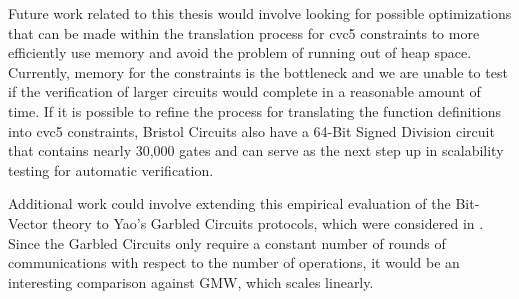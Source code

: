 \documentclass{article}
\begin{document}
Future work related to this thesis would involve looking for possible optimizations that can be made within the translation process for cvc5 constraints to more efficiently use memory and avoid the problem of running out of heap space. Currently, memory for the constraints is the bottleneck and we are unable to test if the verification of larger circuits would complete in a reasonable amount of time. If it is possible to refine the process for translating the function definitions into cvc5 constraints, Bristol Circuits also have a 64-Bit Signed Division circuit that contains nearly 30,000 gates and can serve as the next step up in scalability testing for automatic verification.

Additional work could involve extending this empirical evaluation of the Bit-Vector theory to Yao's Garbled Circuits protocols, which were considered in \cite{skalka-near-ppdp24, skalka-near-esop25}. Since the Garbled Circuits only require a constant number of rounds of communications with respect to the number of operations, it would be an interesting comparison against GMW, which scales linearly. 





\end{document}
